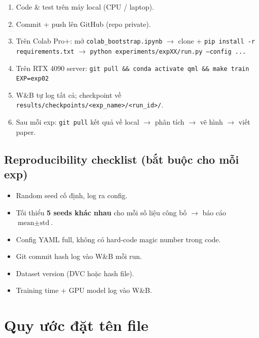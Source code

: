 \documentclass[11pt,a4paper]{article}
\begin{document}
\begin{enumerate}
  \item Code \& test trên máy local (CPU / laptop).
  \item Commit + push lên GitHub (repo private).
  \item Trên Colab Pro+: mở \texttt{colab\_bootstrap.ipynb} $\rightarrow$ clone + \texttt{pip install -r requirements.txt} $\rightarrow$ \texttt{python experiments/expXX/run.py --config ...}
  \item Trên RTX 4090 server: \texttt{git pull \&\& conda activate qml \&\& make train EXP=exp02}
  \item W\&B tự log tất cả; checkpoint về \texttt{results/checkpoints/<exp\_name>/<run\_id>/}.
  \item Sau mỗi exp: \texttt{git pull} kết quả về local $\rightarrow$ phân tích $\rightarrow$ vẽ hình $\rightarrow$ viết paper.
\end{enumerate}

\subsection{Reproducibility checklist (bắt buộc cho mỗi exp)}

\begin{itemize}
  \item Random seed cố định, log ra config.
  \item Tối thiểu \textbf{5 seeds khác nhau} cho mỗi số liệu công bố $\rightarrow$ báo cáo $\text{mean} \pm \text{std}$.
  \item Config YAML full, không có hard-code magic number trong code.
  \item Git commit hash log vào W\&B mỗi run.
  \item Dataset version (DVC hoặc hash file).
  \item Training time + GPU model log vào W\&B.
\end{itemize}

\section{Quy ước đặt tên file}
\end{document}
